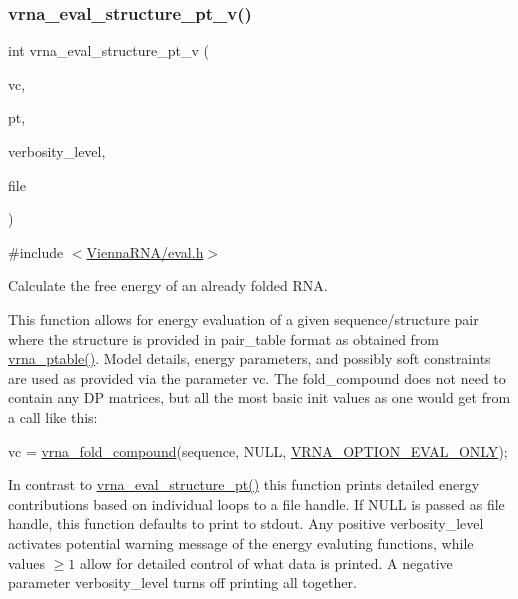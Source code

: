 \subsubsection{\texorpdfstring{vrna\+\_\+eval\+\_\+structure\+\_\+pt\+\_\+v()}{vrna\_eval\_structure\_pt\_v()}}
{\footnotesize\ttfamily int vrna\+\_\+eval\+\_\+structure\+\_\+pt\+\_\+v (\begin{DoxyParamCaption}\item[{\hyperlink{group__fold__compound_ga1b0cef17fd40466cef5968eaeeff6166}{vrna\+\_\+fold\+\_\+compound\+\_\+t} $\ast$}]{vc,  }\item[{const short $\ast$}]{pt,  }\item[{int}]{verbosity\+\_\+level,  }\item[{F\+I\+LE $\ast$}]{file }\end{DoxyParamCaption})}



{\ttfamily \#include $<$\hyperlink{eval_8h}{Vienna\+R\+N\+A/eval.\+h}$>$}



Calculate the free energy of an already folded R\+NA. 

This function allows for energy evaluation of a given sequence/structure pair where the structure is provided in pair\+\_\+table format as obtained from \hyperlink{group__struct__utils_gae829fb8bb7f694c12a9c0bbc34c77c60}{vrna\+\_\+ptable()}. Model details, energy parameters, and possibly soft constraints are used as provided via the parameter \textquotesingle{}vc\textquotesingle{}. The fold\+\_\+compound does not need to contain any DP matrices, but all the most basic init values as one would get from a call like this\+: 
\begin{DoxyCode}
vc = \hyperlink{group__fold__compound_ga6601d994ba32b11511b36f68b08403be}{vrna\_fold\_compound}(sequence, NULL, \hyperlink{group__fold__compound_ga61469c423131552c8483229f8b6c7e0e}{VRNA\_OPTION\_EVAL\_ONLY});
\end{DoxyCode}
 In contrast to \hyperlink{group__eval_gadbd09372ddfd7a450bbd590c96a6bfe4}{vrna\+\_\+eval\+\_\+structure\+\_\+pt()} this function prints detailed energy contributions based on individual loops to a file handle. If N\+U\+LL is passed as file handle, this function defaults to print to stdout. Any positive {\ttfamily verbosity\+\_\+level} activates potential warning message of the energy evaluting functions, while values $ \ge 1 $ allow for detailed control of what data is printed. A negative parameter {\ttfamily verbosity\+\_\+level} turns off printing all together.

